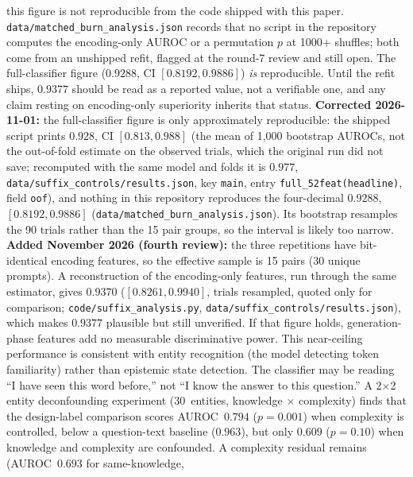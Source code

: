 \documentclass[11pt,a4paper]{article}
\begin{document}
\begin{enumerate}[nosep]
{          this figure is not reproducible from the code shipped with this paper.}
          \texttt{data/\allowbreak matched\_burn\_analysis.json} records that no script in the repository
          computes the encoding-only AUROC or a permutation $p$ at 1000+ shuffles; both come from
          an unshipped refit, flagged at the round-7 review and still open. The
          full-classifier figure ($0.9288$, CI $[0.8192, 0.9886]$) \emph{is} reproducible. Until
          the refit ships, $0.9377$ should be read as a reported value, not a verifiable one, and
          any claim resting on encoding-only superiority inherits that status.
          \textbf{Corrected 2026-11-01:} the full-classifier figure is only approximately reproducible: the shipped script prints $0.928$, CI $[0.813, 0.988]$ (the mean of 1{,}000 bootstrap AUROCs, not the out-of-fold estimate on the observed trials, which the original run did not save; recomputed with the same model and folds it is $0.977$, \texttt{data/suffix\_controls/results.json}, key \texttt{main}, entry \texttt{full\_52feat(headline)}, field \texttt{oof}), and nothing in this repository reproduces the four-decimal $0.9288$, $[0.8192, 0.9886]$ (\texttt{data/matched\_burn\_analysis.json}). Its bootstrap resamples the 90 trials rather than the 15 pair groups, so the interval is likely too narrow.
          \textbf{Added November 2026 (fourth review):} the three repetitions have bit-identical encoding features, so the effective sample is 15 pairs (30 unique prompts). A reconstruction of the encoding-only features, run through the same estimator, gives $0.9370$ ($[0.8261, 0.9940]$, trials resampled, quoted only for comparison; \texttt{code/\allowbreak suffix\_analysis.py}, \texttt{data/\allowbreak suffix\_controls/\allowbreak results.json}), which makes $0.9377$ plausible but still unverified.
          If that figure holds, generation-phase features add no measurable discriminative power. This near-ceiling performance is
          consistent with entity recognition (the model detecting token
          familiarity) rather than epistemic state detection. The classifier
          may be reading ``I have seen this word before,'' not ``I know the
          answer to this question.'' A 2$\times$2 entity deconfounding
          experiment (30~entities, knowledge $\times$ complexity) finds that the design-label comparison scores AUROC~$0.794$ ($p{=}0.001$) when complexity is controlled, below a question-text baseline ($0.963$), but only $0.609$ ($p{=}0.10$) when knowledge and complexity are confounded. A complexity
          residual remains (AUROC~$0.693$ for same-knowledge,

\end{enumerate}
\end{document}
